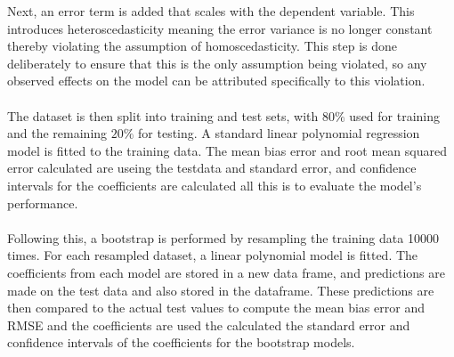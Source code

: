 \noindent Next, an error term is added that scales with the dependent variable. This introduces heteroscedasticity meaning the error variance is no longer constant thereby violating the assumption of homoscedasticity. This step is done deliberately to ensure that this is the only assumption being violated, so any observed effects on the model can be attributed specifically to this violation.
\\\\

The dataset is then split into training and test sets, with $80\%$ used for training and the remaining $20\%$ for testing. A standard linear polynomial regression model is fitted to the training data. The mean bias error and root mean squared error calculated are useing the testdata and standard error, and confidence intervals for the coefficients are calculated all this is to evaluate the model's performance.
\\\\



\noindent Following this, a bootstrap is performed by resampling the training data 10000 times. For each resampled dataset, a linear polynomial model is fitted. The coefficients from each model are stored in a new data frame, and predictions are made on the test data and also stored in the dataframe. These predictions are then compared to the actual test values to compute the mean bias error and RMSE and the coefficients are used the calculated the standard error and confidence intervals of the coefficients for the bootstrap models.
\\\\



